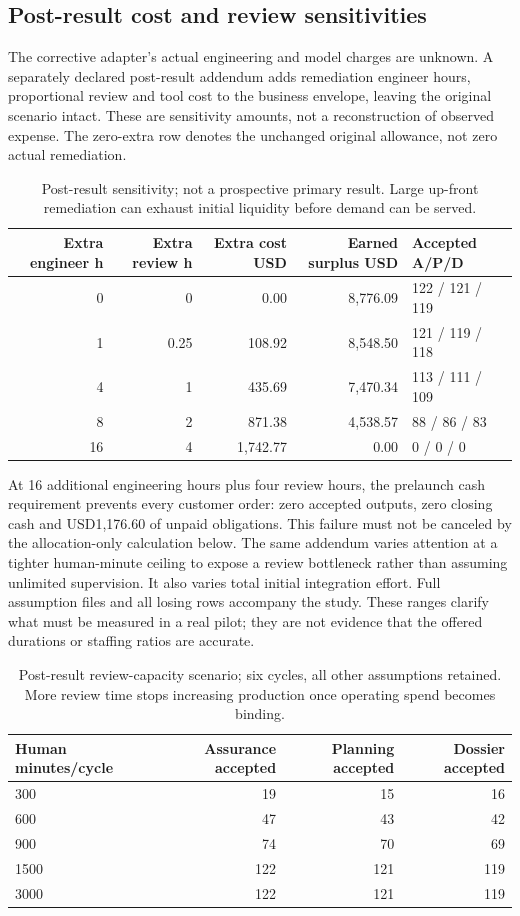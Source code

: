 \subsection{Post-result cost and review sensitivities}
The corrective adapter's actual engineering and model charges are unknown. A separately declared post-result addendum adds remediation engineer hours, proportional review and tool cost to the business envelope, leaving the original scenario intact. These are sensitivity amounts, not a reconstruction of observed expense. The zero-extra row denotes the unchanged original allowance, not zero actual remediation.
\begin{table}[H]\small\centering\begin{tabular}{rrrrl}\toprule
Extra engineer h & Extra review h & Extra cost USD & Earned surplus USD & Accepted A/P/D \\\midrule
0 & 0 & 0.00 & 8,776.09 & 122 / 121 / 119 \\
1 & 0.25 & 108.92 & 8,548.50 & 121 / 119 / 118 \\
4 & 1 & 435.69 & 7,470.34 & 113 / 111 / 109 \\
8 & 2 & 871.38 & 4,538.57 & 88 / 86 / 83 \\
16 & 4 & 1,742.77 & 0.00 & 0 / 0 / 0 \\
\bottomrule\end{tabular}\caption{Post-result sensitivity; not a prospective primary result. Large up-front remediation can exhaust initial liquidity before demand can be served.}\end{table}
At 16 additional engineering hours plus four review hours, the prelaunch cash requirement prevents every customer order: zero accepted outputs, zero closing cash and USD1,176.60 of unpaid obligations. This failure must not be canceled by the allocation-only calculation below. The same addendum varies attention at a tighter human-minute ceiling to expose a review bottleneck rather than assuming unlimited supervision. It also varies total initial integration effort. Full assumption files and all losing rows accompany the study. These ranges clarify what must be measured in a real pilot; they are not evidence that the offered durations or staffing ratios are accurate.
\begin{table}[H]\small\centering\begin{tabular}{lrrr}\toprule
Human minutes/cycle & Assurance accepted & Planning accepted & Dossier accepted \\\midrule
300 & 19 & 15 & 16 \\
600 & 47 & 43 & 42 \\
900 & 74 & 70 & 69 \\
1500 & 122 & 121 & 119 \\
3000 & 122 & 121 & 119 \\
\bottomrule\end{tabular}\caption{Post-result review-capacity scenario; six cycles, all other assumptions retained. More review time stops increasing production once operating spend becomes binding.}\end{table}
